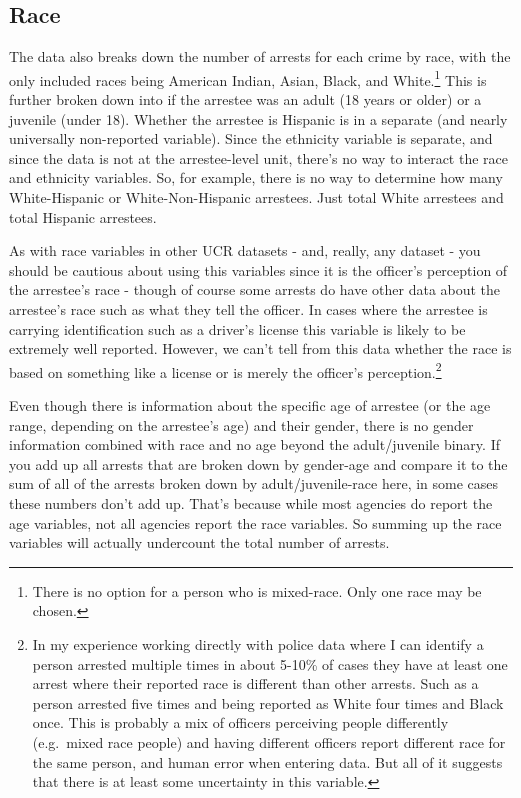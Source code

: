 \documentclass[
  12pt,
  openany]{book}
\begin{document}
\subsection{Race}\label{race}

The data also breaks down the number of arrests for each crime by race, with the only included races being American Indian, Asian, Black, and White.\footnote{There is no option for a person who is mixed-race. Only one race may be chosen.} This is further broken down into if the arrestee was an adult (18 years or older) or a juvenile (under 18). Whether the arrestee is Hispanic is in a separate (and nearly universally non-reported variable). Since the ethnicity variable is separate, and since the data is not at the arrestee-level unit, there's no way to interact the race and ethnicity variables. So, for example, there is no way to determine how many White-Hispanic or White-Non-Hispanic arrestees. Just total White arrestees and total Hispanic arrestees.

As with race variables in other UCR datasets - and, really, any dataset - you should be cautious about using this variables since it is the officer's perception of the arrestee's race - though of course some arrests do have other data about the arrestee's race such as what they tell the officer. In cases where the arrestee is carrying identification such as a driver's license this variable is likely to be extremely well reported. However, we can't tell from this data whether the race is based on something like a license or is merely the officer's perception.\footnote{In my experience working directly with police data where I can identify a person arrested multiple times in about 5-10\% of cases they have at least one arrest where their reported race is different than other arrests. Such as a person arrested five times and being reported as White four times and Black once. This is probably a mix of officers perceiving people differently (e.g.~mixed race people) and having different officers report different race for the same person, and human error when entering data. But all of it suggests that there is at least some uncertainty in this variable.}

Even though there is information about the specific age of arrestee (or the age range, depending on the arrestee's age) and their gender, there is no gender information combined with race and no age beyond the adult/juvenile binary. If you add up all arrests that are broken down by gender-age and compare it to the sum of all of the arrests broken down by adult/juvenile-race here, in some cases these numbers don't add up. That's because while most agencies do report the age variables, not all agencies report the race variables. So summing up the race variables will actually undercount the total number of arrests.
\end{document}
